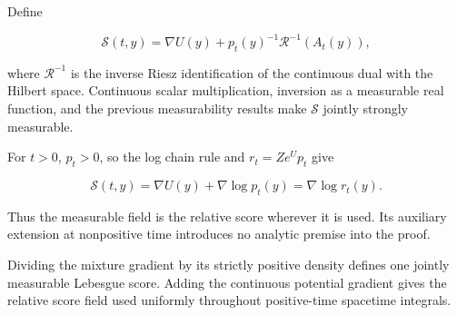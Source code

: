 \documentclass[11pt,a4paper]{report}
\begin{document}
Define

\[\mathcal S(t,y)=\nabla U(y)+p_t(y)^{-1}\mathcal R^{-1}(A_t(y)),\]

where \(\mathcal R^{-1}\) is the inverse Riesz identification of the continuous dual with the Hilbert space. Continuous scalar multiplication, inversion as a measurable real function, and the previous measurability results make \(\mathcal S\) jointly strongly measurable.



For \(t>0\), \(p_t>0\), so the log chain rule and \(r_t=Z e^U p_t\) give

\[\mathcal S(t,y)=\nabla U(y)+\nabla\log p_t(y)=\nabla\log r_t(y).\]

Thus the measurable field is the relative score wherever it is used. Its auxiliary extension at nonpositive time introduces no analytic premise into the proof.



Dividing the mixture gradient by its strictly positive density defines one jointly measurable Lebesgue score. Adding the continuous potential gradient gives the relative score field used uniformly throughout positive-time spacetime integrals.
\end{document}
